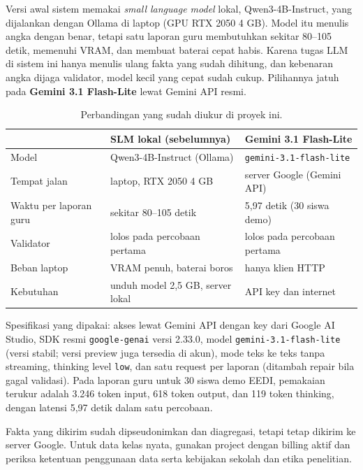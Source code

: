 \documentclass[11pt,a4paper]{article}
\begin{document}
Versi awal sistem memakai \emph{small language model} lokal, Qwen3-4B-Instruct, yang dijalankan dengan Ollama di
laptop (GPU RTX 2050 4 GB). Model itu menulis angka dengan benar, tetapi satu laporan guru membutuhkan sekitar 80--105
detik, memenuhi VRAM, dan membuat baterai cepat habis. Karena tugas LLM di sistem ini hanya menulis ulang fakta yang
sudah dihitung, dan kebenaran angka dijaga validator, model kecil yang cepat sudah cukup. Pilihannya jatuh pada
\textbf{Gemini 3.1 Flash-Lite} lewat Gemini API resmi.

\begin{table}[h]
  \centering\small
  \begin{tabularx}{\linewidth}{@{}l L L@{}}
    \toprule
    & SLM lokal (sebelumnya) & \textbf{Gemini 3.1 Flash-Lite} \\
    \midrule
    Model & Qwen3-4B-Instruct (Ollama) & \texttt{gemini-3.1-flash-lite} \\
    Tempat jalan & laptop, RTX 2050 4 GB & server Google (Gemini API) \\
    Waktu per laporan guru & sekitar 80--105 detik & 5,97 detik (30 siswa demo) \\
    Validator & lolos pada percobaan pertama & lolos pada percobaan pertama \\
    Beban laptop & VRAM penuh, baterai boros & hanya klien HTTP \\
    Kebutuhan & unduh model 2,5 GB, server lokal & API key dan internet \\
    \bottomrule
  \end{tabularx}
  \caption{Perbandingan yang sudah diukur di proyek ini.}
\end{table}

Spesifikasi yang dipakai: akses lewat Gemini API dengan key dari Google AI Studio, SDK resmi \texttt{google-genai}
versi 2.33.0, model \texttt{gemini-3.1-flash-lite} (versi stabil; versi preview juga tersedia di akun), mode teks ke
teks tanpa streaming, thinking level \texttt{low}, dan satu request per laporan (ditambah repair bila gagal validasi).
Pada laporan guru untuk 30 siswa demo EEDI, pemakaian terukur adalah 3.246 token input, 618 token output, dan 119 token
thinking, dengan latensi 5,97 detik dalam satu percobaan.

\begin{peringatan}
  Fakta yang dikirim sudah dipseudonimkan dan diagregasi, tetapi tetap dikirim ke server Google. Untuk data kelas
  nyata, gunakan project dengan billing aktif dan periksa ketentuan penggunaan data serta kebijakan sekolah dan etika
  penelitian.
\end{peringatan}
\end{document}
